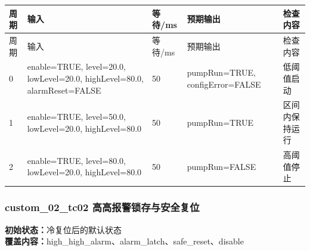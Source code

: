 \begin{longtable}{L{1.0cm}L{4.7cm}L{1.4cm}L{4.0cm}L{2.1cm}}

\toprule

周期 & 输入 & 等待/ms & 预期输出 & 检查内容\\

\midrule

\endfirsthead

\toprule

周期 & 输入 & 等待/ms & 预期输出 & 检查内容\\

\midrule

\endhead

0 & enable=TRUE, level=20.0, lowLevel=20.0, highLevel=80.0, alarmReset=FALSE & 50 & pumpRun=TRUE, configError=FALSE & 低阈值启动\\

1 & enable=TRUE, level=50.0, lowLevel=20.0, highLevel=80.0 & 50 & pumpRun=TRUE & 区间内保持运行\\

2 & enable=TRUE, level=80.0, lowLevel=20.0, highLevel=80.0 & 50 & pumpRun=FALSE & 高阈值停止\\

\bottomrule

\end{longtable}

\subsubsection{{\ttfamily custom\_02\_tc02} 高高报警锁存与安全复位}

\noindent\textbf{初始状态：}冷复位后的默认状态\\

\textbf{覆盖内容：}high\_high\_alarm、alarm\_latch、safe\_reset、disable

